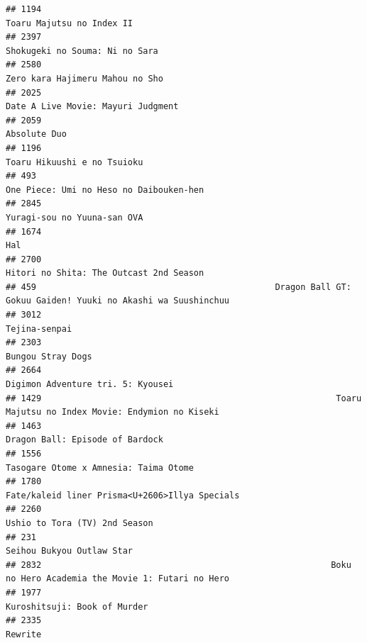 \documentclass[
]{article}
\begin{document}
\begin{verbatim}
## 1194                                                                                 Toaru Majutsu no Index II
## 2397                                                                            Shokugeki no Souma: Ni no Sara
## 2580                                                                           Zero kara Hajimeru Mahou no Sho
## 2025                                                                        Date A Live Movie: Mayuri Judgment
## 2059                                                                                              Absolute Duo
## 1196                                                                               Toaru Hikuushi e no Tsuioku
## 493                                                                    One Piece: Umi no Heso no Daibouken-hen
## 2845                                                                               Yuragi-sou no Yuuna-san OVA
## 1674                                                                                                       Hal
## 2700                                                                   Hitori no Shita: The Outcast 2nd Season
## 459                                               Dragon Ball GT: Gokuu Gaiden! Yuuki no Akashi wa Suushinchuu
## 3012                                                                                             Tejina-senpai
## 2303                                                                                         Bungou Stray Dogs
## 2664                                                                         Digimon Adventure tri. 5: Kyousei
## 1429                                                          Toaru Majutsu no Index Movie: Endymion no Kiseki
## 1463                                                                           Dragon Ball: Episode of Bardock
## 1556                                                                     Tasogare Otome x Amnesia: Taima Otome
## 1780                                                            Fate/kaleid liner Prisma<U+2606>Illya Specials
## 2260                                                                             Ushio to Tora (TV) 2nd Season
## 231                                                                                  Seihou Bukyou Outlaw Star
## 2832                                                         Boku no Hero Academia the Movie 1: Futari no Hero
## 1977                                                                              Kuroshitsuji: Book of Murder
## 2335                                                                                                   Rewrite

\end{verbatim}
\end{document}
